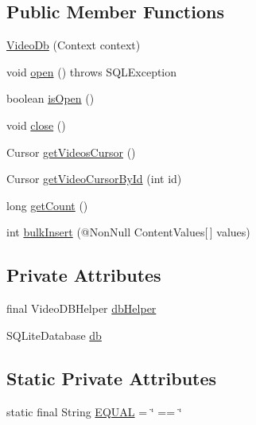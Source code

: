 \subsection*{Public Member Functions}
\begin{DoxyCompactItemize}
\item 
\hyperlink{classorg_1_1buildmlearn_1_1videocollection_1_1data_1_1VideoDb_a5daf7ff7784a07abbce1a4779b07b9a5}{Video\+Db} (Context context)
\item 
void \hyperlink{classorg_1_1buildmlearn_1_1videocollection_1_1data_1_1VideoDb_a2b5761e732d3d4aeae611700c7f6ed4b}{open} ()  throws S\+Q\+L\+Exception 
\item 
boolean \hyperlink{classorg_1_1buildmlearn_1_1videocollection_1_1data_1_1VideoDb_aabe1543989e661d2a52d0765298c0ecb}{is\+Open} ()
\item 
void \hyperlink{classorg_1_1buildmlearn_1_1videocollection_1_1data_1_1VideoDb_a43d1c2d6c6117451594fbd9317bc51a3}{close} ()
\item 
Cursor \hyperlink{classorg_1_1buildmlearn_1_1videocollection_1_1data_1_1VideoDb_a9832aab22ccb82ac56c47951c0bc3062}{get\+Videos\+Cursor} ()
\item 
Cursor \hyperlink{classorg_1_1buildmlearn_1_1videocollection_1_1data_1_1VideoDb_a67461c4d9a16d790895a649fc62a1aa4}{get\+Video\+Cursor\+By\+Id} (int id)
\item 
long \hyperlink{classorg_1_1buildmlearn_1_1videocollection_1_1data_1_1VideoDb_a8cf312e875577d3e2918e5eb5882e707}{get\+Count} ()
\item 
int \hyperlink{classorg_1_1buildmlearn_1_1videocollection_1_1data_1_1VideoDb_a730da14ed6d7cc5882db6395a9ffe6b8}{bulk\+Insert} (@Non\+Null Content\+Values\mbox{[}$\,$\mbox{]} values)
\end{DoxyCompactItemize}
\subsection*{Private Attributes}
\begin{DoxyCompactItemize}
\item 
final Video\+D\+B\+Helper \hyperlink{classorg_1_1buildmlearn_1_1videocollection_1_1data_1_1VideoDb_ae0dfa9bfa10105f597185697acea5ef1}{db\+Helper}
\item 
S\+Q\+Lite\+Database \hyperlink{classorg_1_1buildmlearn_1_1videocollection_1_1data_1_1VideoDb_a13c2c2f463036c2bae0ba0e427d18ae1}{db}
\end{DoxyCompactItemize}
\subsection*{Static Private Attributes}
\begin{DoxyCompactItemize}
\item 
static final String \hyperlink{classorg_1_1buildmlearn_1_1videocollection_1_1data_1_1VideoDb_abcf1a1288c4eca09ef95244b8e41ee49}{E\+Q\+U\+AL} = \char`\"{} == \char`\"{}
\end{DoxyCompactItemize}


